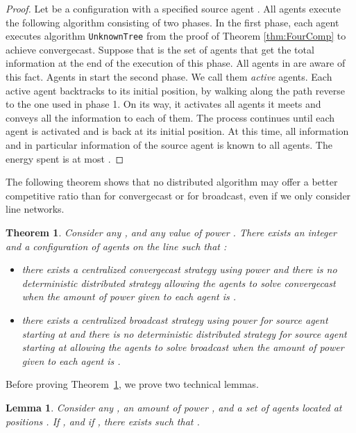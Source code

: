 \documentclass{article}
\newtheorem{lemma}{Lemma}
\newtheorem{theorem}{Theorem}
\newcommand\TwoAprTree{\mbox{{\tt UnknownTree}}\xspace}
\newcommand\convergecast{convergecast\xspace}
\newcommand\broadcast{broadcast\xspace}
\begin{document}
\begin{proof}
Let  be a configuration with a specified source agent . All agents execute the following algorithm consisting of two phases.
In the first phase, each agent executes algorithm \TwoAprTree from the proof of Theorem \ref{thm:FourComp} to achieve convergecast. Suppose that  is the set of agents that get the total information at the end of the execution of this phase. All agents in  are aware of this fact. Agents in  start the second phase. We call them \emph{active} agents. 
Each active agent backtracks to its initial position, by walking along the path reverse to the one used in phase 1. On its way, it 
activates all agents it meets and conveys all the information to each of them. The process continues until each agent is activated and is back at its initial position. At this time, all information and in particular information of the source agent  is known to all agents. The energy spent is at most .
\end{proof}

The following theorem shows that no distributed algorithm may offer a
better competitive ratio than  for convergecast or for broadcast, even if we only consider line networks. 

\begin{theorem}\label{thm:TwoAprOpt}
Consider any , and any value of power . There exists an
integer  and a configuration  of  agents on the line
such that  :
\begin{itemize}
\item there exists a centralized {\convergecast} strategy using power  and
there is no deterministic distributed strategy allowing the
agents to solve {\convergecast} when the amount of power given to each
agent is .
\item there exists a centralized {\broadcast} strategy using power  for source agent starting at  
and there is no deterministic distributed strategy for source agent starting at   allowing the
agents to solve {\broadcast} when the amount of power given to each
agent is .
\end{itemize}
\end{theorem}

Before proving Theorem~\ref{thm:TwoAprOpt}, we prove two technical lemmas.  

\begin{lemma}\label{lem-offline-group}
Consider any , an amount of power , and a
set   of  agents located at
positions .  If ,
and if , there exists  such
that .
\end{lemma}
\end{document}
